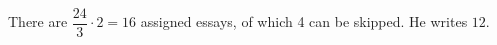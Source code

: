 There are $\dfrac{24}{3}\cdot2=16$ assigned essays, of which 4 can be skipped. He writes $\boxed{12}$.
